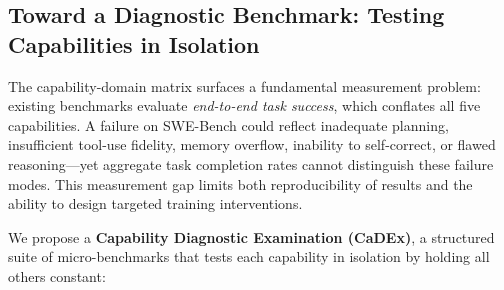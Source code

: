 \subsection{Toward a Diagnostic Benchmark: Testing Capabilities in Isolation}

The capability-domain matrix surfaces a fundamental measurement problem: existing benchmarks evaluate \emph{end-to-end task success}, which conflates all five capabilities. A failure on SWE-Bench could reflect inadequate planning, insufficient tool-use fidelity, memory overflow, inability to self-correct, or flawed reasoning---yet aggregate task completion rates cannot distinguish these failure modes. This measurement gap limits both reproducibility of results and the ability to design targeted training interventions.

We propose a \textbf{Capability Diagnostic Examination (CaDEx)}, a structured suite of micro-benchmarks that tests each capability in isolation by holding all others constant:

